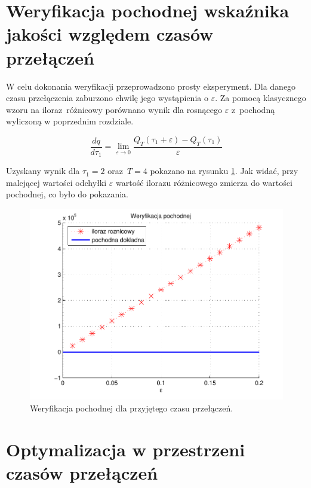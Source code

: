 \documentclass[11pt]{mwart}
\begin{document}
\section{Weryfikacja pochodnej wskaźnika jakości względem czasów przełączeń}

W celu dokonania weryfikacji przeprowadzono prosty eksperyment. Dla danego czasu przełączenia zaburzono chwilę jego wystąpienia o $\varepsilon$. Za pomocą klasycznego wzoru na iloraz~różnicowy porównano wynik dla rosnącego $\varepsilon$ z~pochodną wyliczoną w poprzednim rozdziale.

\begin{equation}
	\frac{dq}{d\tau_{1}}=\lim_{\varepsilon\rightarrow0}\frac{Q_{T}\left(\tau_{1}+\varepsilon\right)-Q_{T}\left(\tau_{1}\right)}{\varepsilon}
\end{equation}

\pagebreak
Uzyskany wynik dla $\tau_{1}=2$ oraz~$T=4$ pokazano na rysunku \ref{fig-werpochodna}. Jak widać, przy malejącej wartości odchyłki $\varepsilon$ wartość ilorazu różnicowego zmierza do wartości pochodnej, co było do pokazania.

\begin{figure}[H]
	\begin{centering}
	\includegraphics[scale=1.0]{pochodna}
	\caption{Weryfikacja pochodnej dla przyjętego czasu przełączeń.}
	\label{fig-werpochodna}
	\end{centering}
\end{figure}

\section{Optymalizacja w przestrzeni czasów przełączeń}
\end{document}
